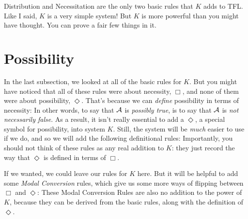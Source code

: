 Distribution and Necessitation are the only two basic rules that $K$ adds to TFL. Like I said, $K$ is a very simple system! But $K$ is more powerful than you might have thought. You can prove a fair few things in it.


\section{Possibility}
\label{possibility}

In the last subsection, we looked at all of the basic rules for $K$. But you might have noticed that all of these rules were about necessity, $\Box$, and none of them were about possibility, $\Diamond$. That's because we can \emph{define} possibility in terms of necessity:
In other words, to say that $\mathcal{A}$ is \emph{possibly true}, is to say that $\mathcal{A}$ is \emph{not necessarily false}. As a result, it isn't really essential to add a $\Diamond$, a special symbol for possibility, into system $K$. Still, the system will be \emph{much} easier to use if we do, and so we will add the following definitional rules:
Importantly, you should not think of these rules as any real addition to $K$: they just record the way that $\Diamond$ is defined in terms of $\Box$.

If we wanted, we could leave our rules for $K$ here. But it will be helpful to add some \emph{Modal Conversion} rules, which give us some more ways of flipping between $\Box$ and $\Diamond$:
These Modal Conversion Rules are also no addition to the power of $K$, because they can be derived from the basic rules, along with the definition of $\Diamond$. 

